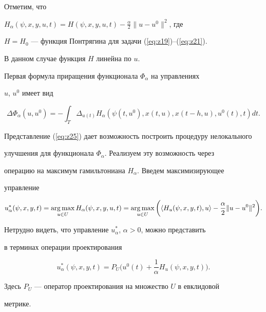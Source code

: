 Отметим, что


$H_\alpha(\psi,x,y,u,t)=H(\psi,x,y,u,t)-\frac{\alpha}{2}\|u-u^0\|^2$, где


$H=H_0$ --- функция Понтрягина для задачи (\ref{eq:z19})--(\ref{eq:z21}).


В данном случае функция $H$ линейна по $u$.





Первая формула приращения функционала $\Phi_\alpha$ на управлениях


$u$, $u^0$ имеет вид


\begin{equation}


\Delta\Phi_\alpha(u,u^0)=-\int_T\Delta_{u(t)}


H_\alpha(\psi(t,u^0),x(t,u),x(t-h,u),u^0(t),t)dt.


\label{eq:z25}


\end{equation}





Представление (\ref{eq:z25}) дает возможность построить процедуру нелокального


улучшения для функционала $\Phi_\alpha$. Реализуем эту возможность через


операцию на максимум гамильтониана $H_\alpha$. Введем максимизирующее


управление


$$


u_\alpha^*(\psi,x,y,t)=\argmax_{u\in U}H_\alpha(\psi,x,y,u,t)=


\argmax_{u\in U}\bigg(\langle H_u(\psi,x,y,t),u\rangle


-\frac{\alpha}{2}\|u-u^0\|^2\bigg).


$$


Нетрудно видеть, что управление $u_\alpha^*$, $\alpha>0$, можно представить


в терминах операции проектирования


$$


u_\alpha^*(\psi,x,y,t)=


P_U\bigg(u^0(t)+\frac{1}{\alpha}H_u(\psi,x,y,t)\bigg).


$$


Здесь $P_U$ --- оператор проектирования на множество $U$ в евклидовой


метрике.





